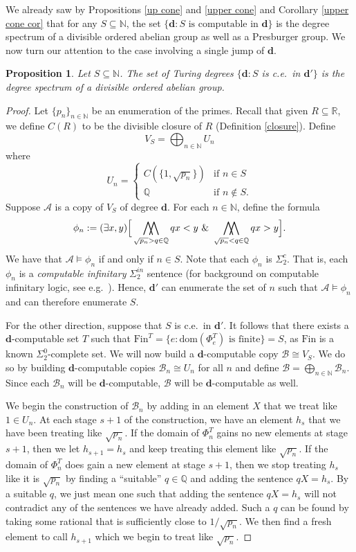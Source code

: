 \documentclass{amsart}%
\numberwithin{theorem}{section}
\newtheorem{proposition}[theorem]{Proposition}
\newcommand{\Q}{\mathbb{Q}}
\newcommand{\R}{\mathbb{R}}
\newcommand{\N}{\mathbb{N}}
\newcommand{\A}{\mathcal{A}}
\newcommand{\B}{\mathcal{B}}
\newcommand{\0}{\emptyset}
\newcommand{\ddd}{\boldsymbol{d}}
\DeclareMathOperator*{\WW}{\bigwedge\mkern-12mu\bigwedge}
\newcommand{\E}{\exists}
\newcommand{\dom}{\text{dom}}
\newcommand{\Fin}{\text{Fin}}
\begin{document}
We already saw by Propositions \ref{up cone} and \ref{upper cone} and Corollary \ref{upper cone cor} that for any $S\subseteq \N$, the set $\{\ddd: S \text{ is computable in } \ddd\}$ is the degree spectrum of a divisible ordered abelian group as well as a Presburger group. We now turn our attention to the case involving a single jump of $\ddd$. 

\begin{proposition}
\label{degrees}
Let $S\subseteq \N$. The set of Turing degrees $\{\ddd: S$ is c.e.\ in $\ddd'\}$ is the degree spectrum of a divisible ordered abelian group.



\end{proposition}


\begin{proof}
    Let $\{p_n\}_{n\in \N}$ be an enumeration of the primes. Recall that given $R\subseteq\R$, we define $C(R)$ to be the divisible closure of $R$ (Definition \ref{closure}). Define $$V_S=\bigoplus_{n\in \N} U_n$$ where $$U_n = \begin{cases} C(\{1,\sqrt{p_n}\}) & \text{if } n\in S\\
\Q & \text{if } n\notin S.
\end{cases}$$ Suppose $\A$ is a copy of $V_S$ of degree $\ddd$. For each $n\in \N$, define the formula $$\phi_n := (\E x,y)\Big[\WW_{\sqrt{p_n}>q\in \Q} q x <y \,\,\&\,\, \WW_{\sqrt{p_n}<q\in \Q} q x> y   \Big].  $$ 
We have that $\A\models \phi_n$ if and only if $n\in S$. Note that each $\phi_n$ is $\Sigma^c_2$. That is, each $\phi_n$ is a \emph{computable infinitary} $\Sigma^{in}_2$ sentence (for background on computable infinitary logic, see e.g.\ \cite{AK-book}).  Hence, $\ddd'$ can enumerate the set of $n$ such that $\A\models \phi_n$ and can therefore enumerate $S$. 

For the other direction,  suppose that $S$ is c.e.\ in $\ddd'$. It follows that there exists a $\ddd$-computable set $T$ such that $\Fin^T = \{e: \dom(\Phi^T_e) \text{ is finite}\}= S$, as $\Fin$ is a known $\Sigma^0_2$-complete set. We will now build a $\ddd$-computable copy $\B\cong V_S$. We do so by building $\ddd$-computable copies $\B_n\cong U_n$ for all $n$ and define $\B=\bigoplus_{n\in \N} \B_n$. Since each $\B_n$ will be $\ddd$-computable, $\B$ will be $\ddd$-computable as well.

 We begin the construction of $\B_n$ by adding in an element $X$ that we treat like $1\in U_n$. At each stage $s+1$ of the construction, we have an element $h_s$  that we have been treating like $\sqrt{p_n}$. If the domain of $\Phi_n^T$ gains no new elements at stage $s+1$, then we let $h_{s+1}=h_s$ and keep treating this element like $\sqrt{p_n}$. If the domain of $\Phi_n^T$ does gain a new element at stage $s+1$, then we stop treating $h_s$ like it is $\sqrt{p_n}$ by finding a ``suitable'' $q\in \Q$  and adding the sentence $qX=h_s$. By a suitable $q$, we just mean one such that adding the sentence $qX=h_s$ will not contradict any of the sentences we have already added. Such a $q$ can be found by taking some rational that is sufficiently close to $1/\sqrt{p_n}$. We then find a fresh element to call $h_{s+1}$ which we begin to treat like $\sqrt{p_n}$. 


\end{proof}
\end{document}
